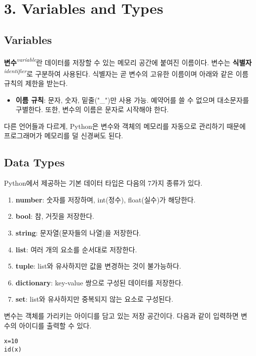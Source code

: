 \section[3. Variables and Types - {\it 변수와 타입}]{3. Variables and Types}

\subsection{Variables}

\textbf{변수}\textit{\textsuperscript{variable}}란 데이터를 저장할 수 있는 메모리 공간에 붙여진 이름이다. 변수는 \textbf{식별자}\textit{\textsuperscript{identifier}}로 구분하여 사용된다. 식별자는 곧 변수의 고유한 이름이며 아래와 같은 이름 규칙의 제한을 받는다.

\begin{itemize}
  \item \textbf{이름 규칙}: 문자, 숫자, 밑줄("\_")만 사용 가능. 예약어를 쓸 수 없으며 대소문자를 구별한다. 또한, 변수의 이름은 문자로 시작해야 한다.
\end{itemize}
다른 언어들과 다르게, Python은 변수와 객체의 메모리를 자동으로 관리하기 때문에 프로그래머가 메모리를 덜 신경써도 된다.

\subsection{Data Types}
Python에서 제공하는 기본 데이터 타입은 다음의 7가지 종류가 있다.

\begin{enumerate}
\def\labelenumi{\arabic{enumi}.}
  \item \textbf{number}: 숫자를 저장하며, int(정수), float(실수)가 해당한다.
  \item \textbf{bool}: 참, 거짓을 저장한다.
  \item \textbf{string}: 문자열(문자들의 나열)을 저장한다.
  \item \textbf{list}: 여러 개의 요소를 순서대로 저장한다.
  \item \textbf{tuple}: list와 유사하지만 값을 변경하는 것이 불가능하다.
  \item \textbf{dictionary}: key-value 쌍으로 구성된 데이터를 저장한다.
  \item \textbf{set}: list와 유사하지만 중복되지 않는 요소로 구성된다.
\end{enumerate}
변수는 객체를 가리키는 아이디를 담고 있는 저장 공간이다. 다음과 같이 입력하면 변수의 아이디를 출력할 수 있다.

\begin{tcolorbox}[colframe=black, colback=white]
\begin{verbatim}
x=10
id(x)
\end{verbatim}
\end{tcolorbox}

